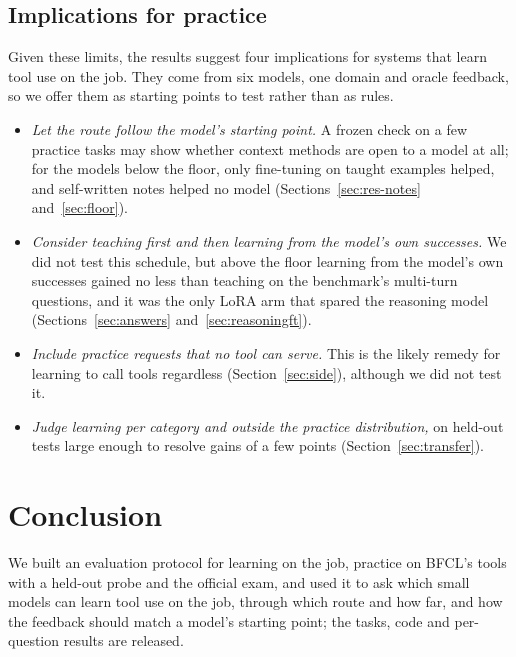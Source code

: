 \documentclass[a4paper,fleqn]{cas-dc}
\begin{document}
\subsection{Implications for practice}\label{sec:guidance}
Given these limits, the results suggest four implications for systems that learn tool use on the job. They come from six models, one domain and oracle feedback, so we offer them as starting points to
test rather than as rules.
\begin{itemize}[leftmargin=1.5em,itemsep=1pt,topsep=3pt]
\item \emph{Let the route follow the model's starting point.} A frozen check on a few practice tasks may show whether
  context methods are open to a model at all; for the models below the floor, only fine-tuning on taught examples
  helped, and self-written notes helped no model (Sections~\ref{sec:res-notes} and~\ref{sec:floor}).
\item \emph{Consider teaching first and then learning from the model's own successes.} We did not test this schedule,
  but above the floor learning from the model's own successes gained no less than teaching on the benchmark's multi-turn questions, and it was
  the only LoRA arm that spared the reasoning model
  (Sections~\ref{sec:answers} and~\ref{sec:reasoningft}).
\item \emph{Include practice requests that no tool can serve.} This is the likely remedy for learning to call tools
  regardless (Section~\ref{sec:side}), although we did not test it.
\item \emph{Judge learning per category and outside the practice distribution,} on held-out tests large enough to
  resolve gains of a few points (Section~\ref{sec:transfer}).
\end{itemize}

\section{Conclusion}\label{sec:conclusion}
We built an evaluation protocol for learning on the job, practice on BFCL's tools with a held-out probe and the
official exam, and used it to ask which small models can learn tool use on the job, through which route and how far,
and how the feedback should match a model's starting point; the tasks, code and per-question results are released.
\end{document}

